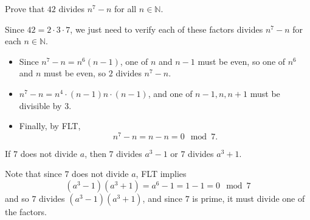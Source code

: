 \documentclass[11pt,dvipsnames]{book}
\def\gcd{{\rm gcd}}
\numberwithin{equation}{section} %
\numberwithin{figure}{section} %
\numberwithin{table}{section} %
\begin{document}



\begin{exercise}
Prove that $42$ divides $n^7-n$ for all $n\in\mathbb{N}$. 
\begin{solution}
Since $42 = 2\cdot 3 \cdot 7$, we just need to verify each of these factors divides $n^7-n$ for each $n\in\mathbb{N}$.
\begin{itemize}
\item Since $n^7-n=n^6(n-1)$, one of $n$ and $n-1$ must be even, so one of $n^6$ and $n$ must be even, so $2$ divides $n^{7}-n$.
\item $n^7-n = n^4\cdot (n-1)n\cdot (n-1)$, and one of $n-1,n,n+1$ must be divisible by 3. 
\item Finally, by FLT,
\[
n^7-n = n-n=0 \mod 7.
\]
\end{itemize}
\end{solution}
\end{exercise}

\begin{exercise}
If $7$ does not divide $a$, then $7$ divides $a^3-1$ or $7$ divides $a^3+1$. 
\begin{solution}

Note that since $7$ does not divide $a$, FLT implies
\[
(a^{3}-1)(a^3+1) = a^6-1 = 1-1=0 \mod 7
\]
and so $7$ divides $(a^{3}-1)(a^3+1) $, and since $7$ is prime, it must divide one of the factors. 
\end{solution}
\end{exercise}

%
%
\end{document}
